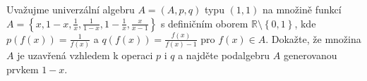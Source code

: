\subsubsection{}
Uvažujme univerzální algebru $A=(A,p,q)$ typu $(1,1)$ na množině funkcí $A=\left
\{ x,1-x,\frac{1}{x},\frac{1}{1-x},1-\frac{1}{x},\frac{x}{x-1} \right \}$ s
definičním oborem $\mathbb{R} \setminus \left \{ 0,1 \right \}$, kde
$p(f(x))=\frac{1}{f(x)}$ a $q(f(x))=\frac{f(x)}{f(x)-1}$ pro $f(x) \in A$.
Dokažte, že množina $A$ je uzavřená vzhledem k operaci $p$ i $q$ a najděte
podalgebru $A$ generovanou prvkem $1-x$.
